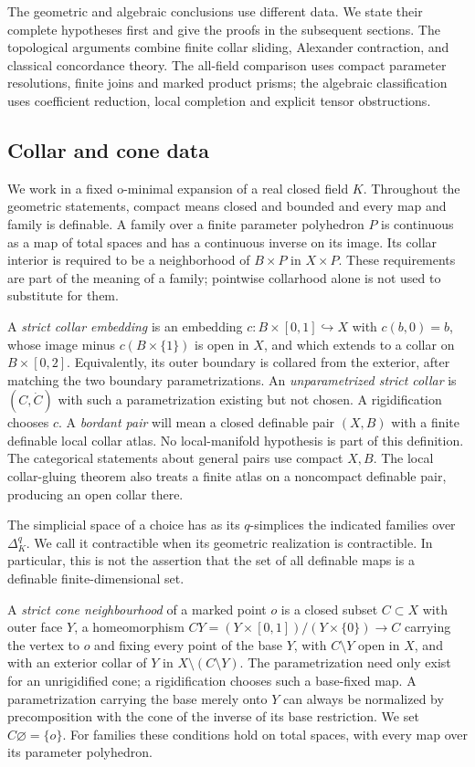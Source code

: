 \documentclass[11pt,a4paper]{article}
\theoremstyle{definition}
\begin{document}
The geometric and algebraic conclusions use different data. We state
their complete hypotheses first and give the proofs in the subsequent
sections. The topological arguments combine finite collar sliding,
Alexander contraction, and classical concordance theory. The all-field
comparison uses compact parameter resolutions, finite joins and marked
product prisms; the algebraic classification uses coefficient reduction,
local completion and explicit tensor obstructions.

\subsection{Collar and cone data}
We work in a fixed o-minimal expansion of a real closed field $K$.
Throughout the geometric statements, compact means closed and bounded and every map and family
is definable. A family over a finite parameter polyhedron $P$ is continuous
as a map of total spaces and has a continuous inverse on its image.
Its collar interior is required to be a neighborhood of $B\times P$ in
$X\times P$. These requirements are part of the meaning of a family;
pointwise collarhood alone is not used to substitute for them.

A \emph{strict collar embedding} is an embedding
$c:B\times[0,1]\hookrightarrow X$ with $c(b,0)=b$, whose image minus
$c(B\times\{1\})$ is open in $X$, and which extends to a collar on
$B\times[0,2]$. Equivalently, its outer boundary is collared from the
exterior, after matching the two boundary parametrizations. An
\emph{unparametrized strict collar} is $(C,\dot C)$ with such a
parametrization existing but not chosen. A rigidification chooses $c$.
 A \emph{bordant pair}
will mean a closed definable pair $(X,B)$ with a finite definable local
collar atlas. No local-manifold hypothesis is part of this definition.
The categorical statements about general pairs use compact $X,B$.
The local collar-gluing theorem also treats a finite atlas on a
noncompact definable pair, producing an open collar there.

The simplicial space of a choice has as its $q$-simplices the indicated
families over $\Delta^q_K$. We call it contractible when its geometric
realization is contractible. In particular, this is not the assertion
that the set of all definable maps is a definable finite-dimensional set.


A \emph{strict cone neighbourhood} of a marked point $o$ is a closed
subset $C\subset X$ with outer face $Y$, a homeomorphism
$CY=(Y\times[0,1])/(Y\times\{0\})\to C$ carrying the vertex to $o$
and fixing every point of the base $Y$, with $C\setminus Y$ open in
$X$, and with an exterior collar of $Y$ in
$X\setminus(C\setminus Y)$. The parametrization need only exist for an
unrigidified cone; a rigidification chooses such a base-fixed map.
A parametrization carrying the base merely onto $Y$ can always be
normalized by precomposition with the cone of the inverse of its
base restriction. We set
$C\varnothing=\{o\}$. For families these conditions hold on total spaces,
with every map over its parameter polyhedron.
\end{document}
